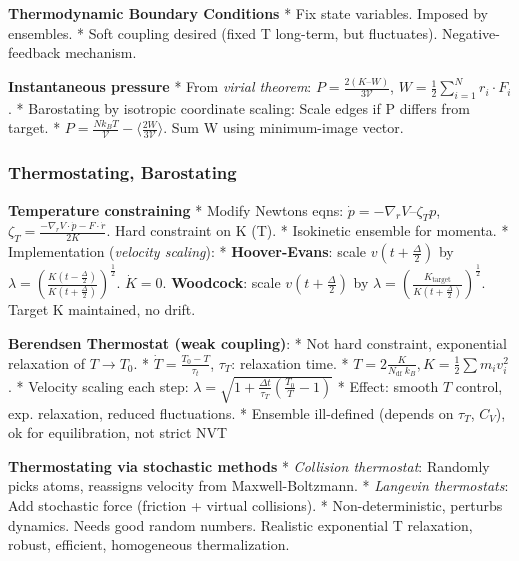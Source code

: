 \documentclass{article}
\begin{document}
\textbf{Thermodynamic Boundary Conditions} * Fix state variables. Imposed by ensembles. * Soft coupling desired (fixed T long-term, but fluctuates). Negative-feedback mechanism.

\textbf{Instantaneous pressure} * From \textit{virial theorem}: \(P = \frac{2(K–W)}{3\mathcal{V}}\), \(W = \frac{1}{2}\sum_{i = 1}^{N}r_{i} \cdot F_{i}\). * Barostating by isotropic coordinate scaling: Scale edges if P differs from target. * \(P = \frac{Nk_{B}T}{\mathcal{V}} - \langle\frac{2W}{3\mathcal{V}}\rangle\). Sum W using minimum-image vector.

\subsubsection{Thermostating, Barostating}\label{thermostating-barostating}  

\textbf{Temperature constraining} * Modify Newtons eqns: \(\dot{p} = - \nabla_{r}V–\zeta_{T}p\), \(\zeta_{T} = \frac{- \nabla_{r}V \cdot \dot{p} - F \cdot \dot{r}}{2K}\). Hard constraint on K (T). * Isokinetic ensemble for momenta. * Implementation (\textit{velocity scaling}): * \textbf{Hoover-Evans}: scale \(v\left( t + \frac{\Delta}{2} \right)\) by \(\lambda = \left( \frac{K\left( t - \frac{\Delta}{2} \right)}{K\left( t + \frac{\Delta}{2} \right)} \right)^{\frac{1}{2}}\). \(\dot{K} = 0\). \textbf{Woodcock}: scale \(v\left( t + \frac{\Delta}{2} \right)\) by \(\lambda = \left( \frac{K_{\text{target}}}{K\left( t + \frac{\Delta}{2} \right)} \right)^{\frac{1}{2}}\). Target K maintained, no drift.

\textbf{Berendsen Thermostat (weak coupling)}: * Not hard constraint, exponential relaxation of \(T \rightarrow T_{0}\). * \(\dot{T} = \frac{T_{0} - T}{\tau_{t}}\), \(\tau_{T}\): relaxation time. * \(T = 2\frac{K}{N_{\text{df }}k_{B}},K = \frac{1}{2}\sum m_{i}v_{i}^{2}\). * Velocity scaling each step: \(\lambda = \sqrt{1 + \frac{\Delta t}{\tau_{T}}\left( \frac{T_{0}}{T} - 1 \right)}\) * Effect: smooth \(T\) control, exp. relaxation, reduced fluctuations. * Ensemble ill-defined (depends on \(\tau_{T}\), \(C_{V}\)), ok for equilibration, not strict NVT 

 \textbf{Thermostating via stochastic methods} * \textit{Collision thermostat}: Randomly picks atoms, reassigns velocity from Maxwell-Boltzmann. * \textit{Langevin thermostats}: Add stochastic force (friction + virtual collisions). * Non-deterministic, perturbs dynamics. Needs good random numbers. Realistic exponential T relaxation, robust, efficient, homogeneous thermalization.
\end{document}
